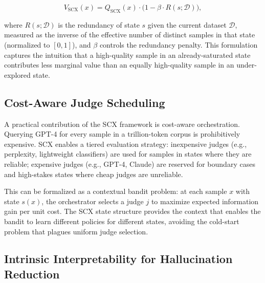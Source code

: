 \documentclass[11pt,twocolumn]{article}
\begin{document}
\begin{equation}
V_{\text{SCX}}(x) = Q_{\text{SCX}}(x) \cdot \bigl(1 - \beta \cdot R(s; \mathcal{D})\bigr),
\label{eq:scx_marginal_value}
\end{equation}

where $R(s; \mathcal{D})$ is the redundancy of state $s$ given the current dataset $\mathcal{D}$, measured as the inverse of the effective number of distinct samples in that state (normalized to $[0,1]$), and $\beta$ controls the redundancy penalty. This formulation captures the intuition that a high-quality sample in an already-saturated state contributes less marginal value than an equally high-quality sample in an under-explored state.

\subsection{Cost-Aware Judge Scheduling}

A practical contribution of the SCX framework is cost-aware orchestration. Querying GPT-4 for every sample in a trillion-token corpus is prohibitively expensive. SCX enables a tiered evaluation strategy: inexpensive judges (e.g., perplexity, lightweight classifiers) are used for samples in states where they are reliable; expensive judges (e.g., GPT-4, Claude) are reserved for boundary cases and high-stakes states where cheap judges are unreliable.

This can be formalized as a contextual bandit problem: at each sample $x$ with state $s(x)$, the orchestrator selects a judge $j$ to maximize expected information gain per unit cost. The SCX state structure provides the context that enables the bandit to learn different policies for different states, avoiding the cold-start problem that plagues uniform judge selection.

\subsection{Intrinsic Interpretability for Hallucination Reduction}
\end{document}
